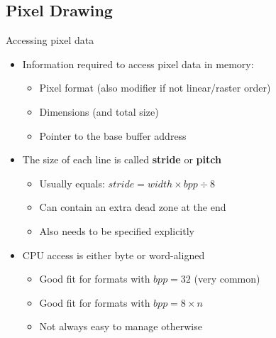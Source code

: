 \subsection{Pixel Drawing}

\begin{frame}{Accessing pixel data}
  \begin{itemize}
  \item Information required to access pixel data in memory:
    \begin{itemize}
    \item Pixel format (also modifier if not linear/raster order)
    \item Dimensions (and total size)
    \item Pointer to the base buffer address
    \end{itemize}
  \item The size of each line is called \textbf{stride} or \textbf{pitch}
    \begin{itemize}
    \item Usually equals: \(stride = width \times bpp \div 8\)
    \item Can contain an extra dead zone at the end
    \item Also needs to be specified explicitly
    \end{itemize}
  \item CPU access is either byte or word-aligned
    \begin{itemize}
    \item Good fit for formats with \(bpp = 32\) (very common)
    \item Good fit for formats with \(bpp = 8 \times n\)
    \item Not always easy to manage otherwise
    \end{itemize}
  \end{itemize}
\end{frame}

